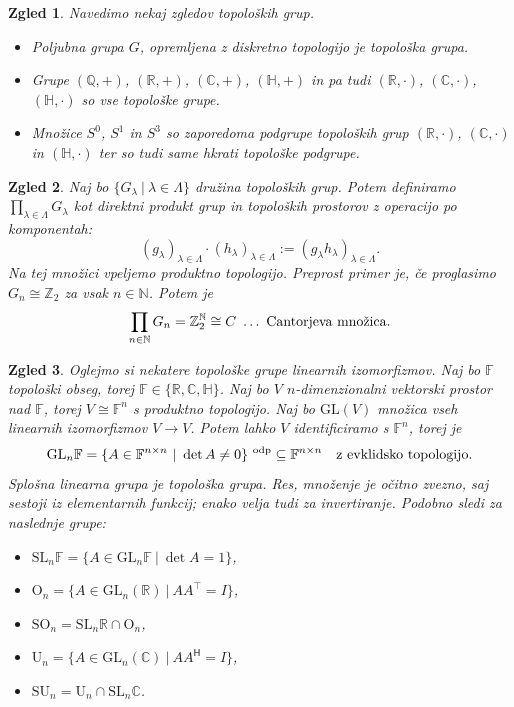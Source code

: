 \documentclass[10pt, a4paper]{article}
\newtheorem{zgled}{Zgled}[section]
\newcommand{\N}{\mathbb {N}}
\newcommand{\Z}{\mathbb {Z}}
\newcommand{\Q}{\mathbb {Q}}
\newcommand{\R}{\mathbb {R}}
\newcommand{\C}{\mathbb {C}}
\newcommand{\Ha}{\mathbb {H}}
\newcommand{\F}{\mathbb {F}}
\begin{document}
\begin{zgled}
  Navedimo nekaj zgledov topoloških grup.
  \begin{itemize}
    \item Poljubna grupa $G$, opremljena z diskretno topologijo je topološka grupa.
    \item Grupe $(\Q, +)$, $(\R, +)$, $(\C, +)$, $(\Ha, +)$ in pa tudi $(\R, \cdot)$, $(\C, \cdot)$, $(\Ha, \cdot)$
    so vse topološke grupe.
    \item Množice $S^0$, $S^1$ in $S^3$ so zaporedoma podgrupe topoloških grup $(\R, \cdot)$, $(\C, \cdot)$ in $(\Ha, \cdot)$
    ter so tudi same hkrati topološke podgrupe.
  \end{itemize}
\end{zgled}

\begin{zgled}
  Naj bo $\{G_\lambda\ |\ \lambda \in \Lambda\}$ družina topoloških grup.
  Potem definiramo $\prod_{\lambda \in \Lambda} G_\lambda$ kot direktni produkt grup 
  in topoloških prostorov z operacijo po komponentah:
  $$(g_\lambda)_{\lambda \in \Lambda} \cdot (h_\lambda)_{\lambda \in \Lambda} := (g_\lambda h_\lambda)_{\lambda \in \Lambda}.$$
  Na tej množici vpeljemo produktno topologijo. Preprost primer je, če proglasimo 
  $G_n \cong \Z_2$ za vsak $n \in \N$. Potem je 
  $$\prod_{n \in \N} G_n = \Z_2^{\N} \cong C\ \ldots\ \textup{Cantorjeva množica}.$$
\end{zgled}

\begin{zgled}
  Oglejmo si nekatere topološke grupe linearnih izomorfizmov.
  Naj bo $\mathbb{F}$ topološki obseg, torej $\mathbb{F} \in \{\R, \C, \Ha\}$.
  Naj bo $V$ $n$-dimenzionalni vektorski prostor nad $\mathbb{F}$, torej 
  $V \cong \mathbb{F}^n$ s produktno topologijo. Naj bo $\mathrm{GL}(V)$
  množica vseh linearnih izomorfizmov $V \to V$.
  Potem lahko $V$ identificiramo s $\mathbb{F}^n$, torej je 
  $$\mathrm{GL}_n \mathbb{F} = \{A \in \mathbb{F}^{n \times n}\ |\ \det A \neq 0\}^{\ \textup{odp}} \subseteq \mathbb{F}^{n \times n}\quad \textup{z evklidsko topologijo.}$$
  Splošna linearna grupa je topološka grupa. Res, množenje je očitno zvezno,
  saj sestoji iz elementarnih funkcij; enako velja tudi za invertiranje.
  Podobno sledi za naslednje grupe:
  \begin{itemize}
    \item $\mathrm{SL}_n \F = \{A \in \mathrm{GL}_n \F\ |\ \det A = 1\}$,
    \item $\mathrm{O}_n = \{A \in \mathrm{GL}_n (\R)\ |\ A A^\top = I\}$,
    \item $\mathrm{SO}_n = \mathrm{SL}_n \R \cap \mathrm{O}_n$,
    \item $\mathrm{U}_n = \{A \in \mathrm{GL}_n (\C)\ |\ A A^\mathsf{H} = I\}$,
    \item $\mathrm{SU}_n = \mathrm{U}_n \cap \mathrm{SL}_n \C$.
  \end{itemize}
\end{zgled}
\end{document}
